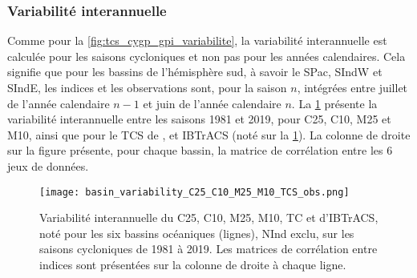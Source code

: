 \documentclass[../main.tex]{subfiles}
\begin{document}
\subsubsection{Variabilité interannuelle}\label{sec:variabilite_5_indices}

Comme pour la \cref{fig:tcs_cygp_gpi_variabilite}, la variabilité interannuelle est calculée pour les saisons cycloniques et non pas pour les années
calendaires. Cela signifie que pour les bassins de l'hémisphère sud, à savoir le SPac, SIndW et SIndE, les indices et les observations sont, pour la saison $n$,
intégrées entre juillet de l'année calendaire $n-1$ et juin de l'année calendaire $n$. La \cref{fig:variabilite_basin_5_indices} présente la variabilité
interannuelle entre les saisons \num{1981} et \num{2019}, pour C25, C10, M25 et M10, ainsi que pour le TCS de \textcite{tippett_poisson_2011}, et IBTrACS (noté
 sur la \cref{fig:variabilite_basin_5_indices}). La colonne de droite sur la figure présente, pour chaque bassin, la matrice de corrélation entre
les 6 jeux de données.

\begin{figure}[p]
    \centering
    \texttt{[image: basin\_variability\_C25\_C10\_M25\_M10\_TCS\_obs.png]}
    \caption{Variabilité interannuelle du C25, C10, M25, M10, TC et d'IBTrACS, noté  pour les six bassins océaniques (lignes), NInd exclu, sur
    les saisons cycloniques de \num{1981} à \num{2019}. Les matrices de corrélation entre indices sont présentées sur la colonne de droite à chaque ligne.}
    \label{fig:variabilite_basin_5_indices}
\end{figure}
\end{document}
